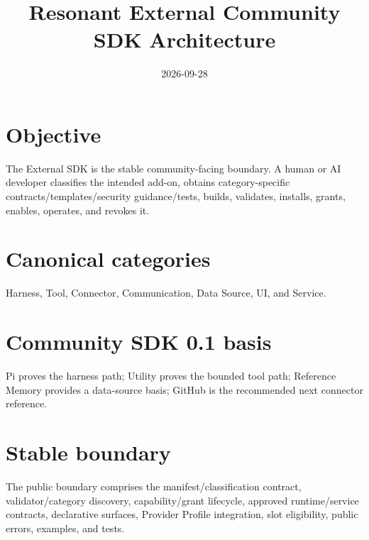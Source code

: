 \documentclass[11pt]{article}
\title{Resonant External Community SDK Architecture}\date{2026-09-28}
\begin{document}
\maketitle
\section{Objective}
The External SDK is the stable community-facing boundary. A human or AI developer classifies the intended add-on, obtains category-specific contracts/templates/security guidance/tests, builds, validates, installs, grants, enables, operates, and revokes it.
\section{Canonical categories}
Harness, Tool, Connector, Communication, Data Source, UI, and Service.
\section{Community SDK 0.1 basis}
Pi proves the harness path; Utility proves the bounded tool path; Reference Memory provides a data-source basis; GitHub is the recommended next connector reference.
\section{Stable boundary}
The public boundary comprises the manifest/classification contract, validator/category discovery, capability/grant lifecycle, approved runtime/service contracts, declarative surfaces, Provider Profile integration, slot eligibility, public errors, examples, and tests.
\end{document}
